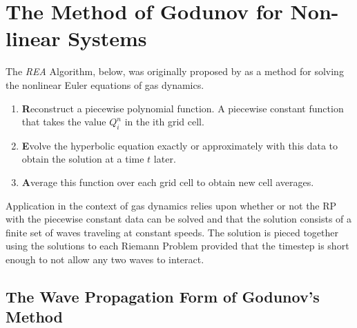\documentclass[]{article}
\begin{document}
		
\section{The Method of Godunov for Non-linear Systems}
	The \textit{REA} Algorithm, below, was originally proposed by \cite{Godunov:1959} as a method for solving the nonlinear Euler equations of gas dynamics. 
	\begin{enumerate}
		\item \textbf{R}econstruct a piecewise polynomial function. A piecewise constant function that takes the value $ Q_i^n $ in the ith grid cell.
		\item  \textbf{E}volve the hyperbolic equation exactly or approximately with this data to obtain the solution at a time $ t $ later.
		\item \textbf{A}verage this function over each grid cell to obtain new cell averages.
	\end{enumerate}
	Application in the context of gas dynamics relies upon whether or not the RP with the piecewise constant data can be solved and that the solution consists of a finite set of waves traveling at constant speeds. The solution is pieced together using the solutions to each Riemann Problem provided that the timestep is short enough to not allow any two waves to interact.
	
	\subsection{The Wave Propagation Form of Godunov's Method}
	
\end{document}
